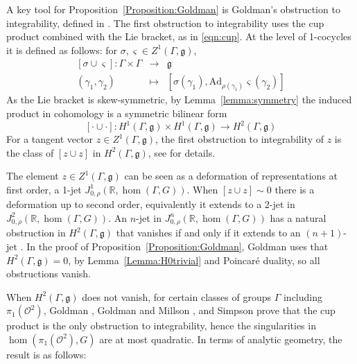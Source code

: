 \documentclass[a4paper,11pt]{article}
\begin{document}
A key tool for
Proposition~\ref{Proposition:Goldman}
is Goldman's obstruction
to integrability, defined in \cite{Goldman}. 
The first obstruction  to integrability uses the cup product
combined with the Lie bracket, as in \eqref{eqn:cup}. At the level of 1-cocycles it is defined as follows:
for $\sigma,\varsigma\in  Z^1(\Gamma,\mathfrak{g})$, 
$$
\begin{array}{rcl}
[\sigma\cup\varsigma]\colon
\Gamma\times\Gamma & \to & \mathfrak g \\
(\gamma_1,\gamma_2) & \mapsto & [\sigma(\gamma_1), \mathrm{Ad}_{\rho(\gamma_1)}\varsigma(\gamma_2)] 
\end{array}
$$
As the Lie bracket is skew-symmetric, by Lemma~\ref{lemma:symmetry} the induced product in cohomology 
is a symmetric bilinear form 
% 
$$
[\cdot\cup\cdot]\colon H^1(\Gamma, \mathfrak{g})
\times H^1(\Gamma, \mathfrak{g}) \to H^2(\Gamma, \mathfrak{g}) 
$$
For a tangent vector $z\in Z^1(\Gamma,\mathfrak g)$, the first obstruction to integrability of $z$
is the class  of $[z\cup z]$ in $H^2( \Gamma, \mathfrak{g})$, see
\cite{Goldman,HPS} for details.

The element $z\in Z^1(\Gamma,\mathfrak g)$ can be seen as a deformation of representations at first order,
a 1-jet $J^1_{0,\rho}(\mathbb R,\hom(\Gamma, G) )  $.
When $[z\cup z]\sim 0$   there is a deformation up to second order, equivalently it extends to  a 2-jet  in  $J^2_{0,\rho}(\mathbb R,\hom(\Gamma, G) )  $.
An $n$-jet in  $J^n_{0,\rho}(\mathbb R,\hom(\Gamma, G) )  $ has a natural obstruction in 
$H^2(\Gamma, \mathfrak{g})$ that vanishes if and only if it extends to an
$(n+1)$-jet \cite{Goldman,HPS}.
In the proof of 
Proposition~\ref{Proposition:Goldman}, Goldman uses that 
 $H^2(\Gamma, \mathfrak{g}) =0$,
 by Lemma~\ref{Lemma:H0trivial} and Poincar\'e duality, 
so all obstructions vanish.

When $H^2(\Gamma, \mathfrak{g})$ does not vanish, for 
certain classes of groups $\Gamma$ including $\pi_1(\mathcal O^2)$, Goldman \cite{GoldmanMaryland}, 
Goldman and Millson  \cite{GoldmanMillson},  and Simpson \cite{Simpson} prove that  the cup product is
the only obstruction to integrability, hence the singularities in 
$\hom(\pi_1(\mathcal O^2), G)$ are at most quadratic.
In terms of analytic geometry, the result is as follows:
\end{document}
